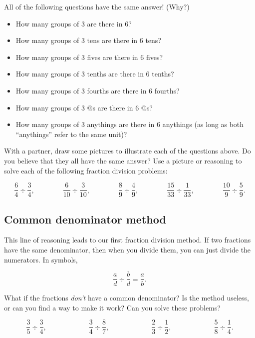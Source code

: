 All of the following questions have the same answer!  (Why?)
\begin{itemize}
\item
How many groups of 3 are there in 6?
\item
How many groups of 3 tens are there in 6 tens?
\item
How many groups of 3 fives are there in 6 fives?
\item
How many groups of 3 tenths are there in 6 tenths?
\item
How many groups of 3 fourths are there in 6 fourths?
\item
How many groups of 3 @s are there in 6 @s?
\item
How many groups of 3 anythings are there in 6 anythings (as long as both ``anythings'' refer to the same unit)?
\end{itemize}



\begin{thinkpair*}
With a partner, draw some pictures to illustrate each of the questions above.  Do you believe that they all have the same answer?  Use a picture or reasoning to solve each of the following fraction division problems:

\[
\frac 6 4 \div \frac 3 4,
\qquad\qquad
\frac 6{10} \div \frac 3{10},
\qquad\qquad
\frac 8 9 \div \frac 4 9,
\qquad\qquad
\frac{15}{33} \div \frac{1}{33},
\qquad\qquad
\frac{10}9 \div \frac{5}9.
\]

\end{thinkpair*}

\subsection{Common denominator method}
This line of reasoning leads  to our first fraction division method.  
If two fractions have the same denominator, then when you divide them, you can just divide the numerators.  In symbols,

\[
\frac a d \div \frac b d = \frac a b.
\]


\begin{thinkpair*}
What if the fractions \emph{don't} have a common denominator?  Is the method useless, or can you find a way to make it work?  Can you solve these problems?

\[
\frac 3 5 \div \frac 3 4,
\qquad\qquad\qquad
\frac 3 4  \div \frac 8 7,
\qquad\qquad\qquad
\frac 2 3  \div \frac 1 2,
\qquad\qquad\qquad
\frac 5 8  \div \frac 1 4.
\]
\end{thinkpair*}




